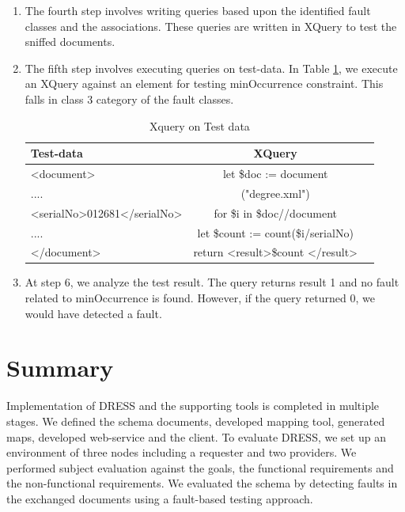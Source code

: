 \documentclass[12pt,a4paper,oneside]{book}
\begin{document}
\begin{enumerate}
		\item The fourth step involves writing queries based upon the identified fault classes and the associations. These queries are written in XQuery to test the sniffed documents. 
		
		
		\item The fifth step involves executing queries on test-data. In Table \ref{tab:xquery-testdata}, we execute an XQuery against an element for testing minOccurrence constraint. This falls in class 3 category of the fault classes. 

\begin{table}[!tbh]
\caption{Xquery on Test data}
\label{tab:xquery-testdata}
\centering
\begin{tabular}[width=\columnwidth]{|p{2.3in}|c|c|}
\hline
Test-data               				& XQuery \\
\hline
\textless document\textgreater 	    	& let \$doc := document \\ 
....	    							& ("degree.xml")  \\
\textless serialNo\textgreater 012681\textless /serialNo\textgreater 	    	& for \$i in \$doc//document   \\
....	    							& let \$count := count(\$i/serialNo)  \\
\textless /document\textgreater	    	&  return \textless result\textgreater {\$count} \textless /result\textgreater  \\
\hline
\end{tabular}
\end{table}
		
		\item At step 6, we analyze the test result. The query returns result 1 and no fault related to minOccurrence is found. However, if the query returned 0, we would have detected a fault. 		
		
	\end{enumerate}

\section{Summary}
Implementation of DRESS and the supporting tools is completed in multiple stages. We defined the schema documents, developed mapping tool, generated maps, developed web-service and the client. To evaluate DRESS, we set up an environment of three nodes including a requester and two providers. We performed subject evaluation against the goals, the functional requirements and the non-functional requirements. We evaluated the schema by detecting faults in the exchanged documents using a fault-based testing approach.
\end{document}
